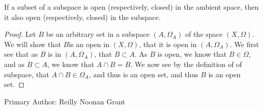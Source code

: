 \begin{minorEx}%
If a subset of a subspace is open (respectively, closed) in the ambient space, then it also open (respectively, closed) in the subspace.
\end{minorEx}

\begin{proof}
  Let $B$ be an arbitrary set in a subspace $(A,\Omega_A)$ of the
  space $(X,\Omega)$. We will show that $B$is an open in $(X,\Omega)$,
  that it is open in $(A,\Omega_A)$. We first see that as $B$ is in
  $(A,\Omega_A)$, that $B \subset A$. As $B$ is open, we know that
  $B\in \Omega$, and as $B \subset A$, we know that $A\cap B=B$. We
  now see by the definition of of subspace, that $A\cap B \in
  \Omega_A$, and thus is an open set, and thus $B$ is an open set.
\end{proof}

Primary Author: Reilly Noonan Grant

